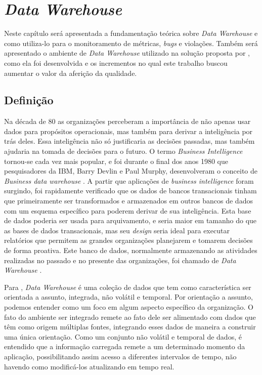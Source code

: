 \chapter{\textit{Data Warehouse}} 
\label{chap:arquitetura}

Neste capítulo será apresentada a fundamentação teórica sobre \textit{Data Warehouse} e como utiliza-lo para o monitoramento de métricas, \textit{bugs} e violações. Também será apresentado o ambiente de \textit{Data Warehouse} utilizado na solução proposta por , como ela foi desenvolvida e os incrementos no qual este trabalho buscou aumentar o valor da aferição da qualidade.   

\section{Definição}

Na década de 80 as organizações perceberam a importância de não apenas usar dados para propósitos operacionais, mas também para derivar a inteligência por trás deles. Essa inteligência não só justificaria as decisões passadas, mas também ajudaria na tomada de decisões para o futuro. O termo \textit{Business Intelligence} tornou-se cada vez mais popular, e foi durante o final dos anos 1980 que pesquisadores da IBM, Barry Devlin e Paul Murphy, desenvolveram o conceito de \textit{Business data warehouse }. A partir que aplicações de \textit{business intelligence } foram surgindo, foi rapidamente verificado que os dados de bancos transacionais tinham que primeiramente ser transformados e armazenados em outros bancos de dados com um esquema específico para poderem derivar de sua inteligência. Esta base de dados poderia ser usada para arquivamento, e seria maior em tamanho do que as bases de dados transacionais, mas seu \textit{design} seria ideal para executar relatórios que permitem as grandes organizações planejarem e tomarem decisões de forma proativa. Este banco de dados, normalmente armazenando as atividades realizadas no passado e no presente das organizações, foi chamado de \textit{Data Warehouse} \cite{neeraj_sharma_2011}.

Para , \textit{Data Warehouse} é uma coleção de dados que tem como característica ser orientada a assunto, integrada, não volátil e temporal. Por orientação a assunto, podemos entender como um foco em algum aspecto específico da organização. O fato do ambiente ser integrado remete ao fato dele ser alimentado com dados que têm como origem múltiplas fontes, integrando esses dados de maneira a construir uma única orientação. Como um conjunto não volátil e temporal de dados, é entendido que a informação carregada remete a um determinado momento da aplicação, possibilitando assim acesso a diferentes intervalos de tempo, não havendo como modificá-los atualizando em tempo real.

